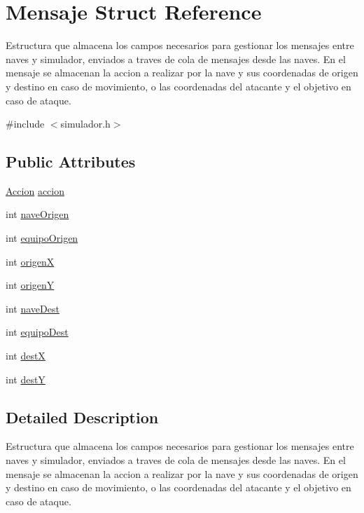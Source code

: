 \hypertarget{structMensaje}{}\section{Mensaje Struct Reference}
\label{structMensaje}


Estructura que almacena los campos necesarios para gestionar los mensajes entre naves y simulador, enviados a traves de cola de mensajes desde las naves. En el mensaje se almacenan la accion a realizar por la nave y sus coordenadas de origen y destino en caso de movimiento, o las coordenadas del atacante y el objetivo en caso de ataque.  




{\ttfamily \#include $<$simulador.\+h$>$}

\subsection*{Public Attributes}
\begin{DoxyCompactItemize}
\item 
\hyperlink{simulador_8h_abddf580b360dbb86fa351f5a944ff315}{Accion} \hyperlink{structMensaje_a4109c5e8bc40c2c00da21ce6c991379b}{accion}
\item 
int \hyperlink{structMensaje_a33d63bdf8d56cb942bbb30b4da5c8e79}{nave\+Origen}
\item 
int \hyperlink{structMensaje_a379e7d2a1ec5faee0cdc6fc3a4eb6de6}{equipo\+Origen}
\item 
int \hyperlink{structMensaje_a57427586f1955551b892ebdfb4839e86}{origenX}
\item 
int \hyperlink{structMensaje_ab890838ae5e84341319fad6c5d67c679}{origenY}
\item 
int \hyperlink{structMensaje_a8f10066420dfb608ee23b6f0da6fd9e9}{nave\+Dest}
\item 
int \hyperlink{structMensaje_a072d13fc6e1950ee5a2a498546601145}{equipo\+Dest}
\item 
int \hyperlink{structMensaje_aaef39ec609b257dda8f0d010a78edd52}{destX}
\item 
int \hyperlink{structMensaje_ac05217b42439ce3d5c7e685e5531b28e}{destY}
\end{DoxyCompactItemize}


\subsection{Detailed Description}
Estructura que almacena los campos necesarios para gestionar los mensajes entre naves y simulador, enviados a traves de cola de mensajes desde las naves. En el mensaje se almacenan la accion a realizar por la nave y sus coordenadas de origen y destino en caso de movimiento, o las coordenadas del atacante y el objetivo en caso de ataque. 


